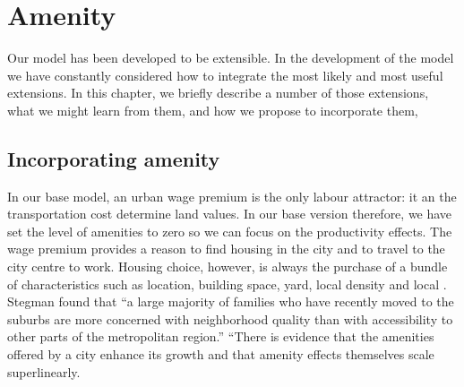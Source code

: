 \chapter{Amenity}\label{chapter-amenity}
Our model has been developed to be extensible. In the development of the model we have constantly considered how to integrate the most likely and most useful extensions. In this chapter, we briefly describe a number of those extensions, what we might learn from them, and how we propose to incorporate them,



\section[Amenity]{Incorporating amenity}\label{section-amenity}
In our base model,  an urban wage premium is the only labour attractor: it an the transportation cost determine land values. In our base version therefore, we have set the level of amenities to zero  so we can focus on the productivity effects. The wage premium provides a reason to find housing in the city and to travel to the city centre to work. Housing choice, however, is always the purchase of a bundle of characteristics such as location, building space, yard, local density and local . Stegman  found that ``a large majority of families who have recently moved to the suburbs are more concerned with neighborhood quality than with accessibility to other parts of the metropolitan region.'' 
``There is evidence that the amenities offered by a city enhance its growth \cite{clarkAmenitiesDriveUrban2002, falckPhantomOperaCultural2011a} and that amenity effects themselves scale superlinearly\cite{kraemerCulturalSustainabilityUS2022}. 



